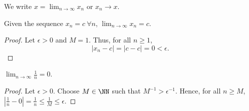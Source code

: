 \begin{notation}
We write $x = \lim_{n\to \infty}x_n$ or $x_n\to x$. 
\end{notation}

\begin{example}
Given the sequence $x_n = c~\forall n$, $\lim_{n\to \infty} x_n = c$.
\end{example}
\begin{proof}
Let $\epsilon>0$ and $M=1$. Thus, for all $n\geq 1$, 
\[
|x_n-c| = |c-c| = 0<\epsilon.
\]
\end{proof}

\begin{example}
$\lim_{n\to \infty} \frac{1}{n} = 0$.
\end{example}
\begin{proof}
Let $\epsilon>0$. Choose $M\in \NN$ such that $M^{-1}>\epsilon^{-1}$. Hence, for all $n\geq M$, $\left|\frac{1}{n} - 0\right| = \frac{1}{n} \leq \frac{1}{M} \leq \epsilon.$
\end{proof}